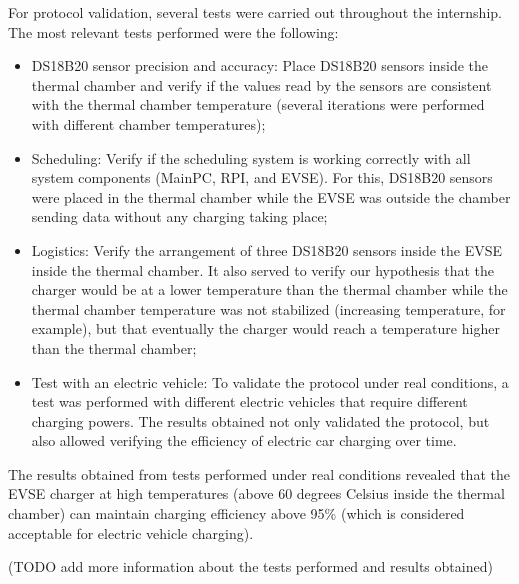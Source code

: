 For protocol validation, several tests were carried out throughout the internship. The most relevant tests performed were the following:
\begin{itemize}
    \item DS18B20 sensor precision and accuracy: Place DS18B20 sensors inside the thermal chamber and verify if the values read by the sensors are consistent with the thermal chamber temperature (several iterations were performed with different chamber temperatures);
    \item Scheduling: Verify if the scheduling system is working correctly with all system components (MainPC, RPI, and EVSE). For this, DS18B20 sensors were placed in the thermal chamber while the EVSE was outside the chamber sending data without any charging taking place;
    \item Logistics: Verify the arrangement of three DS18B20 sensors inside the EVSE inside the thermal chamber. It also served to verify our hypothesis that the charger would be at a lower temperature than the thermal chamber while the thermal chamber temperature was not stabilized (increasing temperature, for example), but that eventually the charger would reach a temperature higher than the thermal chamber;
    \item Test with an electric vehicle: To validate the protocol under real conditions, a test was performed with different electric vehicles that require different charging powers. The results obtained not only validated the protocol, but also allowed verifying the efficiency of electric car charging over time.
\end{itemize}

The results obtained from tests performed under real conditions revealed that the EVSE charger at high temperatures (above 60 degrees Celsius inside the thermal chamber) can maintain charging efficiency above 95\% (which is considered acceptable for electric vehicle charging).

(TODO add more information about the tests performed and results obtained)